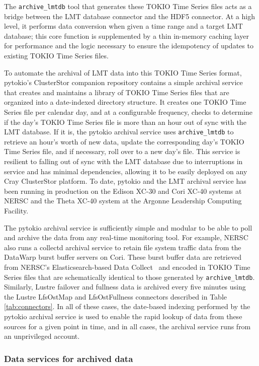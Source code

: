 The \texttt{archive\_lmtdb} tool that generates these TOKIO Time Series files acts as a bridge between the LMT database connector and the HDF5 connector.
At a high level, it performs data conversion when given a time range and a target LMT database; this core function is supplemented by a thin in-memory caching layer for performance and the logic necessary to ensure the idempotency of updates to existing TOKIO Time Series files.

To automate the archival of LMT data into this TOKIO Time Series format, pytokio's ClusterStor companion repository contains a simple archival service that creates and maintains a library of TOKIO Time Series files that are organized into a date-indexed directory structure.
It creates one TOKIO Time Series file per calendar day, and at a configurable frequency, checks to determine if the day's TOKIO Time Series file is more than an hour out of sync with the LMT database.
If it is, the pytokio archival service uses \texttt{archive\_lmtdb} to retrieve an hour's worth of new data, update the corresponding day's TOKIO Time Series file, and if necessary, roll over to a new day's file.
This service is resilient to falling out of sync with the LMT database due to interruptions in service and has minimal dependencies, allowing it to be easily deployed on any Cray ClusterStor platform.
To date, pytokio and the LMT archival service has been running in production on the Edison XC-30 and Cori XC-40 systems at NERSC and the Theta XC-40 system at the Argonne Leadership Computing Facility.

The pytokio archival service is sufficiently simple and modular to be able to poll and archive the data from any real-time monitoring tool.
For example, NERSC also runs a collectd archival service to retain file system traffic data from the DataWarp burst buffer servers on Cori. 
These burst buffer data are retrieved from NERSC's Elasticsearch-based Data Collect~\cite{Whitney2016} and encoded in TOKIO Time Series files that are schematically identical to those generated by \texttt{archive\_lmtdb}.
Similarly, Lustre failover and fullness data is archived every five minutes using the Lustre LfsOstMap and LfsOstFullness connectors described in Table \ref{tab:connectors}.
In all of these cases, the date-based indexing performed by the pytokio archival service is used to enable the rapid lookup of data from these sources for a given point in time, and in all cases, the archival service runs from an unprivileged account.

\subsubsection{Data services for archived data}

